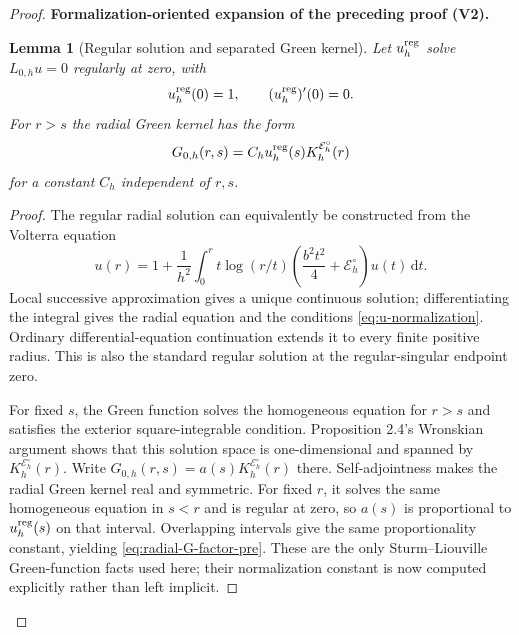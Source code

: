 \documentclass[11pt]{article}
\newtheorem{lemma}[theorem]{Lemma}
\newcommand{\formalisationparentid}{X}
\newenvironment{formalisationaddition}[1]{\par\medskip\begingroup\color{blue}\def\formalisationparentid{#1}\setcounter{formalizationsublemma}{0}\let\lemma\formalizationsublemma\let\endlemma\endformalizationsublemma
  \def\Eo{\mathcal E_h^\circ}\def\EE{\mathcal E_h}\def\phio{\phi_h^\circ}\def\phih{\phi_h}\def\Ho{H_h^{\rm atom}(v^\circ)}\def\Ha{H_h^{\rm atom}}\def\HL{H_h^{L}}\def\Dh{D_h}\def\Log{\operatorname{Log}}\def\ellh{\ell_h}\def\Gp{G_{p,h}}\def\Ast{A_{*,h}}\def\ahat{\widehat{\mathfrak a}_h}\def\ah{\mathfrak a_h}\def\rh{\widehat\rho_h}\def\deltah{\widehat\delta_h}\def\oldref##1{\textup{(##1)}}\def\interface##1{\par\noindent\textit{Analytical interface used here.} ##1\par}\def\finish{\par\noindent\textit{Conclusion of the formalization-oriented expansion.} }\par\noindent\textbf{Formalization-oriented expansion of the preceding proof (V2).}\par\smallskip
}{\par\endgroup\medskip
}
\begin{document}
\begin{proof}
\begin{formalisationaddition}{LB.2}
\begin{lemma}[Regular solution and separated Green kernel]\label{sublemma:LB-2-factorization}
Let $u_h^{\rm reg}$ solve $L_{0,h}u=0$ regularly at zero, with
\begin{equation*}
 u_h^{\rm reg}(0)=1,\qquad (u_h^{\rm reg})'(0)=0.
\end{equation*}
For $r>s$ the radial Green kernel has the form
\begin{equation*}
 G_{0,h}(r,s)=C_hu_h^{\rm reg}(s)K_h^{\Eo}(r)
\end{equation*}
for a constant $C_h$ independent of $r,s$.
\end{lemma}
\begin{proof}
The regular radial solution can equivalently be constructed from the Volterra equation
\[
 u(r)=1+\frac1{h^2}\int_0^r t\log(r/t)
       \left(\frac{b^2t^2}{4}+\Eo\right)u(t)\,\mathrm dt.
\]
Local successive approximation gives a unique continuous solution; differentiating the integral gives the radial equation and the conditions \eqref{eq:u-normalization}. Ordinary differential-equation continuation extends it to every finite positive radius. This is also the standard regular solution at the regular-singular endpoint zero.

For fixed $s$, the Green function solves the homogeneous equation for $r>s$ and satisfies the exterior square-integrable condition. Proposition 2.4's Wronskian argument shows that this solution space is one-dimensional and spanned by $K_h^{\Eo}(r)$. Write $G_{0,h}(r,s)=a(s)K_h^{\Eo}(r)$ there. Self-adjointness makes the radial Green kernel real and symmetric. For fixed $r$, it solves the same homogeneous equation in $s<r$ and is regular at zero, so $a(s)$ is proportional to $u_h^{\rm reg}(s)$ on that interval. Overlapping intervals give the same proportionality constant, yielding \eqref{eq:radial-G-factor-pre}. These are the only Sturm--Liouville Green-function facts used here; their normalization constant is now computed explicitly rather than left implicit.
\end{proof}


\end{formalisationaddition}
\end{proof}
\end{document}
